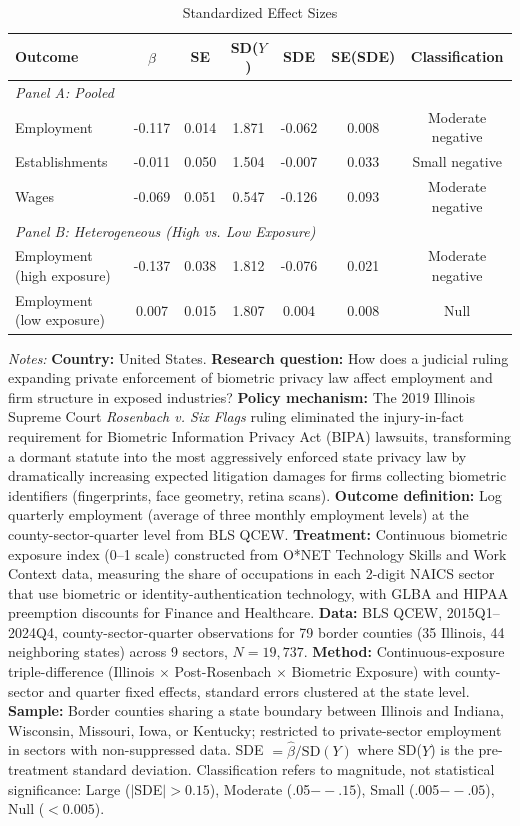 \begin{table}[htbp]
\centering
\caption{Standardized Effect Sizes}
\label{tab:sde}
\begin{tabular}{lcccccc}
\toprule
Outcome & $\hat{\beta}$ & SE & SD($Y$) & SDE & SE(SDE) & Classification \\
\midrule
\multicolumn{7}{l}{\textit{Panel A: Pooled}} \\
\midrule
Employment & -0.117 & 0.014 & 1.871 & -0.062 & 0.008 & Moderate negative \\
Establishments & -0.011 & 0.050 & 1.504 & -0.007 & 0.033 & Small negative \\
Wages & -0.069 & 0.051 & 0.547 & -0.126 & 0.093 & Moderate negative \\
\midrule
\multicolumn{7}{l}{\textit{Panel B: Heterogeneous (High vs. Low Exposure)}} \\
\midrule
Employment (high exposure) & -0.137 & 0.038 & 1.812 & -0.076 & 0.021 & Moderate negative \\
Employment (low exposure) & 0.007 & 0.015 & 1.807 & 0.004 & 0.008 & Null \\
\bottomrule
\end{tabular}
\begin{tablenotes}[flushleft]
\small
\item \textit{Notes:} \textbf{Country:} United States. \textbf{Research question:} How does a judicial ruling expanding private enforcement of biometric privacy law affect employment and firm structure in exposed industries? \textbf{Policy mechanism:} The 2019 Illinois Supreme Court \textit{Rosenbach v. Six Flags} ruling eliminated the injury-in-fact requirement for Biometric Information Privacy Act (BIPA) lawsuits, transforming a dormant statute into the most aggressively enforced state privacy law by dramatically increasing expected litigation damages for firms collecting biometric identifiers (fingerprints, face geometry, retina scans). \textbf{Outcome definition:} Log quarterly employment (average of three monthly employment levels) at the county-sector-quarter level from BLS QCEW. \textbf{Treatment:} Continuous biometric exposure index (0--1 scale) constructed from O*NET Technology Skills and Work Context data, measuring the share of occupations in each 2-digit NAICS sector that use biometric or identity-authentication technology, with GLBA and HIPAA preemption discounts for Finance and Healthcare. \textbf{Data:} BLS QCEW, 2015Q1--2024Q4, county-sector-quarter observations for 79 border counties (35 Illinois, 44 neighboring states) across 9 sectors, $N = 19{,}737$. \textbf{Method:} Continuous-exposure triple-difference (Illinois $\times$ Post-Rosenbach $\times$ Biometric Exposure) with county-sector and quarter fixed effects, standard errors clustered at the state level. \textbf{Sample:} Border counties sharing a state boundary between Illinois and Indiana, Wisconsin, Missouri, Iowa, or Kentucky; restricted to private-sector employment in sectors with non-suppressed data. SDE $= \hat{\beta} / \text{SD}(Y)$ where SD($Y$) is the pre-treatment standard deviation. Classification refers to magnitude, not statistical significance: Large ($|$SDE$| > 0.15$), Moderate (.05$--.15$), Small (.005$--.05$), Null ($< 0.005$).
\end{tablenotes}
\end{table}
